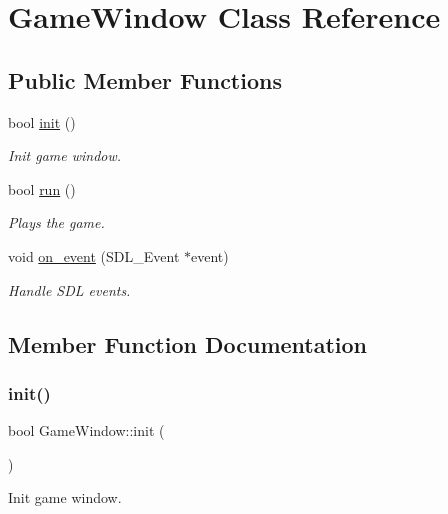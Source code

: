 \hypertarget{classGameWindow}{}\section{Game\+Window Class Reference}
\label{classGameWindow}
\subsection*{Public Member Functions}
\begin{DoxyCompactItemize}
\item 
bool \hyperlink{classGameWindow_a43f9b7ff0038ea306b449d3b618a0ce1}{init} ()
\begin{DoxyCompactList}\small\item\em Init game window. \end{DoxyCompactList}\item 
bool \hyperlink{classGameWindow_a7438d7948280897671b5dc775e8c770e}{run} ()
\begin{DoxyCompactList}\small\item\em Plays the game. \end{DoxyCompactList}\item 
void \hyperlink{classGameWindow_a234682d6db685f5d27fc857a8379c4cb}{on\+\_\+event} (S\+D\+L\+\_\+\+Event $\ast$event)
\begin{DoxyCompactList}\small\item\em Handle S\+DL events. \end{DoxyCompactList}\end{DoxyCompactItemize}


\subsection{Member Function Documentation}
\mbox{\label{classGameWindow_a43f9b7ff0038ea306b449d3b618a0ce1}} 
\subsubsection{\texorpdfstring{init()}{init()}}
{\footnotesize\ttfamily bool Game\+Window\+::init (\begin{DoxyParamCaption}{ }\end{DoxyParamCaption})}



Init game window. 


